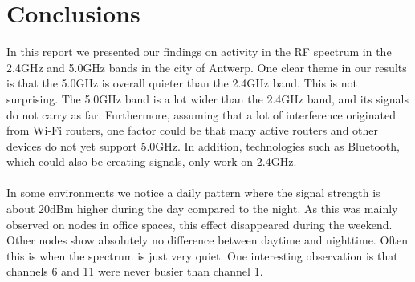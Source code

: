 \documentclass[a4paper, 11pt]{article}
\begin{document}
\section{Conclusions}
In this report we presented our findings on activity in the RF spectrum in the 2.4GHz and 5.0GHz bands in the city of Antwerp. One clear theme in our results is that the 5.0GHz is overall quieter than the 2.4GHz band. This is not surprising. The 5.0GHz band is a lot wider than the 2.4GHz band, and its signals do not carry as far. Furthermore, assuming that a lot of interference originated from Wi-Fi routers, one factor could be that many active routers and other devices do not yet support 5.0GHz. In addition, technologies such as Bluetooth, which could also be creating signals, only work on 2.4GHz.\\ \\
In some environments we notice a daily pattern where the signal strength is about 20dBm higher during the day compared to the night. As this was mainly observed on nodes in office spaces, this effect disappeared during the weekend. Other nodes show absolutely no difference between daytime and nighttime. Often this is when the spectrum is just very quiet. One interesting observation is that channels 6 and 11 were never busier than channel 1. 






\end{document}
